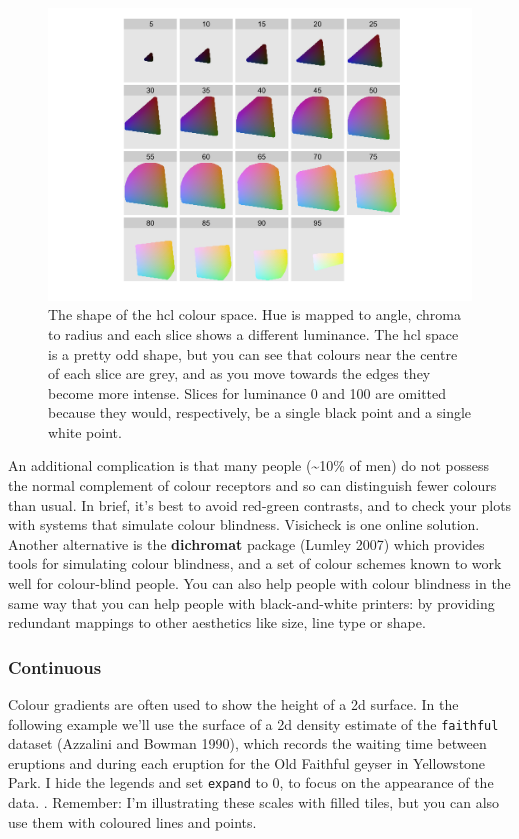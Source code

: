 \begin{figure}[htbp]
  \centering
    \includegraphics[width=\linewidth]{diagrams/hcl-space}
  \caption{The shape of the hcl colour space.  Hue is mapped to angle, chroma to radius and each slice shows a different luminance.  The hcl space is a pretty odd shape, but you can see that colours near the centre of each slice are grey, and as you move towards the edges they become more intense.  Slices for luminance 0 and 100 are omitted because they would, respectively, be a single black point and a single white point.}
  \label{fig:hcl}
\end{figure}

An additional complication is that many people (\textasciitilde{}10\% of
men) do not possess the normal complement of colour receptors and so can
distinguish fewer colours than usual.  In brief,
it's best to avoid red-green contrasts, and to check your plots with
systems that simulate colour blindness. Visicheck is one online
solution. Another alternative is the \textbf{dichromat} package (Lumley
2007) which provides tools for simulating colour blindness, and a set of
colour schemes known to work well for colour-blind people. You can also
help people with colour blindness in the same way that you can help
people with black-and-white printers: by providing redundant mappings to
other aesthetics like size, line type or shape.

\subsubsection{Continuous}\label{ssub:colour-continuous}

Colour gradients are often used to show the height of a 2d surface. In
the following example we'll use the surface of a 2d density estimate of
the \texttt{faithful} dataset (Azzalini and Bowman 1990), which records
the waiting time between eruptions and during each eruption for the Old
Faithful geyser in Yellowstone Park. I hide the legends and set
\texttt{expand} to 0, to focus on the appearance of the data.
 . Remember: I'm
illustrating these scales with filled tiles, but you can also use them
with coloured lines and points.

